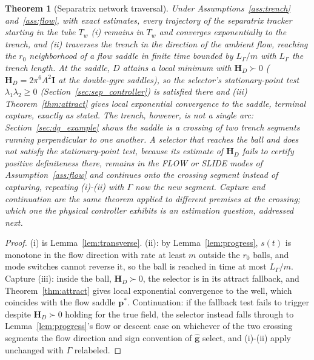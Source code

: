 \documentclass[12pt, letterpaper, oneside]{report}
\newtheorem{theorem}{Theorem}[chapter]
\begin{document}
\begin{theorem}[Separatrix network traversal]
\label{thm:separatrix}
Under Assumptions~\ref{ass:trench} and~\ref{ass:flow}, with exact
estimates, every trajectory of the separatrix tracker starting in the
tube $T_w$ (i) remains in $T_w$ and converges exponentially to the
trench, and (ii) traverses the trench in the direction of the ambient
flow, reaching the $r_0$ neighborhood of a flow saddle in finite time
bounded by $L_\Gamma/m$ with $L_\Gamma$ the trench length. At the
saddle, $D$ attains a local minimum with $\mathbf{H}_D\succ0$
($\mathbf{H}_D=2\pi^6A^2\mathbf{I}$ at the double-gyre saddles), so the
selector's stationary-point test $\lambda_1\lambda_2\geq0$
(Section~\ref{sec:sep_controller}) is satisfied there and (iii)
Theorem~\ref{thm:attract} gives local exponential convergence to the
saddle, terminal capture, exactly as stated. The trench, however, is
not a single arc: Section~\ref{sec:dg_example} shows the saddle is a
crossing of two trench segments running perpendicular to one another.
A selector that reaches the ball and does not satisfy the
stationary-point test, because its estimate of $\mathbf{H}_D$ fails to
certify positive definiteness there, remains in the FLOW or SLIDE modes
of Assumption~\ref{ass:flow} and continues onto the crossing segment
instead of capturing, repeating (i)-(ii) with $\Gamma$ now the new
segment. Capture and continuation are the same theorem applied to
different premises at the crossing; which one the physical controller
exhibits is an estimation question, addressed next.
\end{theorem}

\begin{proof}
(i) is Lemma~\ref{lem:transverse}. (ii): by Lemma~\ref{lem:progress},
$s(t)$ is monotone in the flow direction with rate at least $m$ outside
the $r_0$ balls, and mode switches cannot reverse it, so the ball is
reached in time at most $L_\Gamma/m$. Capture (iii): inside the ball,
$\mathbf{H}_D\succ0$, the selector is in its attract fallback, and
Theorem~\ref{thm:attract} gives local exponential convergence to the
well, which coincides with the flow saddle $\mathbf{p}^*$.
Continuation: if the fallback test fails to trigger despite
$\mathbf{H}_D\succ0$ holding for the true field, the selector instead
falls through to Lemma~\ref{lem:progress}'s flow or descent case on
whichever of the two crossing segments the flow direction and sign
convention of $\hat{\mathbf{g}}$ select, and (i)-(ii) apply unchanged
with $\Gamma$ relabeled.
\end{proof}
\end{document}

